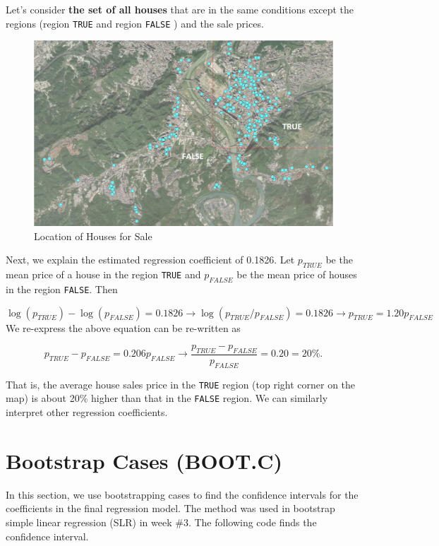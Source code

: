\documentclass[
]{book}
\begin{document}
Let's consider \textbf{the set of all houses} that are in the same conditions except the regions (region \texttt{TRUE} and region \texttt{FALSE} ) and the sale prices.

\begin{figure}

{\centering \includegraphics[width=0.8\linewidth]{img05/w05-map} 

}

\caption{Location of Houses for Sale}\label{fig:unnamed-chunk-92}
\end{figure}

Next, we explain the estimated regression coefficient of 0.1826. Let \(p_{TRUE}\) be the mean price of a house in the region \texttt{TRUE} and \(p_{FALSE}\) be the mean price of houses in the region \texttt{FALSE}. Then

\[
\log (p_{TRUE}) - \log(p_{FALSE}) = 0.1826  \to \log(p_{TRUE}/p_{FALSE}) = 0.1826 \to p_{TRUE} = 1.20p_{FALSE}
\]
We re-express the above equation can be re-written as

\[
p_{TRUE} - p_{FALSE} = 0.206p_{FALSE} \to \frac{p_{TRUE}-p_{FALSE}}{p_{FALSE}} = 0.20 = 20\%.
\]

That is, the average house sales price in the \texttt{TRUE} region (top right corner on the map) is about 20\% higher than that in the \texttt{FALSE} region. We can similarly interpret other regression coefficients.

\hypertarget{bootstrap-cases-boot.c}{%
\section{Bootstrap Cases (BOOT.C)}\label{bootstrap-cases-boot.c}}

In this section, we use bootstrapping cases to find the confidence intervals for the coefficients in the final regression model. The method was used in bootstrap simple linear regression (SLR) in week \#3. The following code finds the confidence interval.
\end{document}
